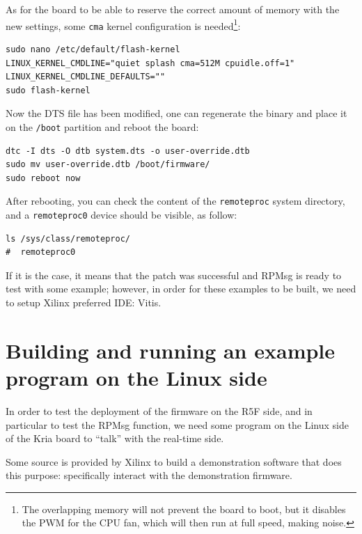 \documentclass[10pt]{article}
\begin{document}
As for the board to be able to reserve the correct amount of memory with the new settings, some
\verb|cma| kernel configuration is needed\footnote{The overlapping memory will not prevent the board to boot,
  but it disables the PWM for the CPU fan, which will then run at full speed, making noise.}:
\begin{tcolorbox}
\begin{verbatim}
sudo nano /etc/default/flash-kernel
LINUX_KERNEL_CMDLINE="quiet splash cma=512M cpuidle.off=1"
LINUX_KERNEL_CMDLINE_DEFAULTS=""
sudo flash-kernel
\end{verbatim}
\end{tcolorbox}

Now the DTS file has been modified, one can regenerate the binary and place it on the \verb|/boot| partition
and reboot the board:
\begin{tcolorbox}
\begin{verbatim}
dtc -I dts -O dtb system.dts -o user-override.dtb
sudo mv user-override.dtb /boot/firmware/
sudo reboot now
\end{verbatim}
\end{tcolorbox}

After rebooting, you can check the content of the \verb|remoteproc| system directory,
and a \verb|remoteproc0| device should be visible, as follow:
\begin{tcolorbox}
\begin{verbatim}
ls /sys/class/remoteproc/
#  remoteproc0
\end{verbatim}
\end{tcolorbox}

If it is the case, it means that the patch was successful and RPMsg is
ready to test with some example; however, in order for these examples
to be built, we need to setup Xilinx preferred IDE: Vitis.


\section{Building and running an example program on the Linux side}
In order to test the deployment of the firmware on the R5F side, and in particular
to test the RPMsg function, we need some program on the Linux side of the Kria
board to ``talk'' with the real-time side.

Some source is provided by Xilinx to build a demonstration software that does
this purpose: specifically interact with the demonstration firmware.
\end{document}
